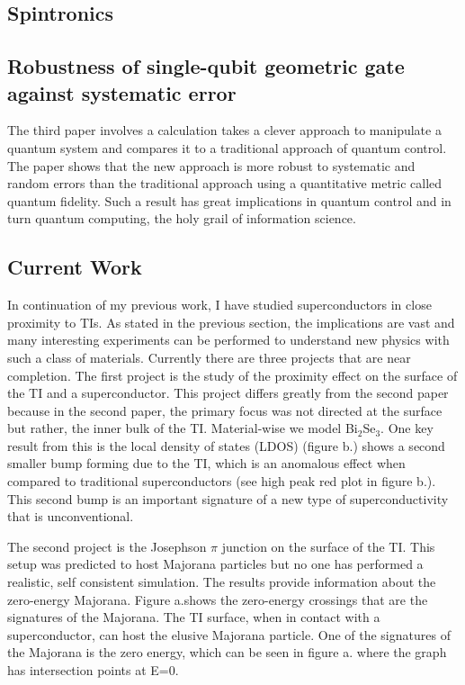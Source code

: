 \documentclass[12pt,twocolumn]{article}
\begin{document}
\subsection*{Spintronics}

\clearpage


\subsection*{Robustness of single-qubit geometric gate against systematic error}
The third paper involves a calculation takes a clever approach to manipulate a quantum system and compares it to a traditional approach of quantum control. The paper shows that the new approach is more robust to systematic and random errors than the traditional approach using a quantitative metric called quantum fidelity. Such a result has great implications in quantum control and in turn quantum computing, the holy grail of information science.

\subsection*{Current Work}
In continuation of my previous work, I have studied superconductors in close proximity to TIs. As stated in the previous section, the implications are vast and many interesting experiments can be performed to understand new physics with such a class of materials. Currently there are three projects that are near completion. The first project is the study of the proximity effect on the surface of the TI and a superconductor. This project differs greatly from the second paper because in the second paper, the primary focus was not directed at the surface but rather, the inner bulk of the TI. Material-wise we model Bi$_2$Se$_3$. One key result from this is the local density of states (LDOS) (figure b.) shows a second smaller bump forming due to the TI, which is an anomalous effect when compared to traditional superconductors (see high peak red plot in figure b.). This second bump is an important signature of a new type of superconductivity that is unconventional. 

The second project is the Josephson $\pi$ junction on the surface of the TI. This setup was predicted to host Majorana particles but no one has performed a realistic, self consistent simulation. The results provide information about the zero-energy Majorana. Figure a.shows the zero-energy crossings that are the signatures of the Majorana. The TI surface, when in contact with a superconductor, can host the elusive Majorana particle. One of the signatures of the Majorana is the zero energy, which can be seen in figure a. where the graph has intersection points at E=0. 
\end{document}
